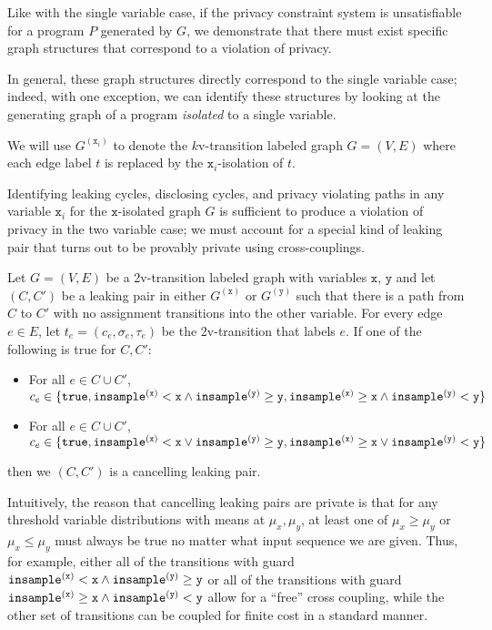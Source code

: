 Like with the single variable case, if the privacy constraint system is unsatisfiable for a program $P$ generated by $G$, we demonstrate that there must exist specific graph structures that correspond to a violation of privacy.

In general, these graph structures directly correspond to the single variable case; indeed, with one exception, we can identify these structures by looking at the generating graph of a program \textit{isolated} to a single variable. 

We will use $G^{(\texttt{x}_i)}$ to denote the $k$v-transition labeled graph $G = (V, E)$ where each edge label $t$ is replaced by the $\texttt{x}_i$-isolation of $t$. 

Identifying leaking cycles, disclosing cycles, and privacy violating paths in any variable $\texttt{x}_i$ for the $\texttt{x}$-isolated graph $G$ is sufficient to produce a violation of privacy in the two variable case; we must account for a special kind of leaking pair that turns out to be provably private using cross-couplings. 

\begin{defn}
    Let $G = (V, E)$ be a 2v-transition labeled graph with variables $\texttt{x}$, $\texttt{y}$ and let $(C, C')$ be a leaking pair in either $G^{(\texttt{x})}$ or $G^{(\texttt{y})}$ such that there is a path from $C$ to $C'$ with no assignment transitions into the other variable. For every edge $e\in E$, let $t_e = (c_e, \sigma_e, \tau_e)$ be the 2v-transition that labels $e$. 
    If one of the following is true for $C, C'$: \begin{itemize}
        \item For all $e\in C\cup C'$, $c_e \in \{\texttt{true}, \mvlguard[\texttt{x}]\land\mvgguard[\texttt{y}], \mvgguard[\texttt{x}]\land\mvlguard[\texttt{y}]\}$
        \item For all $e\in C\cup C'$, $c_e \in \{\texttt{true}, \mvlguard[\texttt{x}]\lor\mvgguard[\texttt{y}], \mvgguard[\texttt{x}]\lor\mvlguard[\texttt{y}]\}$
\end{itemize}
then we $(C, C')$ is a cancelling leaking pair. 
\end{defn}

Intuitively, the reason that cancelling leaking pairs are private is that for any threshold variable distributions with means at $\mu_x,\mu_y$, at least one of $\mu_x\geq\mu_y$ or $\mu_x\leq \mu_y$ must always be true no matter what input sequence we are given. 
Thus, for example, either all of the transitions with guard $\mvlguard[\texttt{x}]\land\mvgguard[\texttt{y}]$ or all of the transitions with guard $\mvgguard[\texttt{x}]\land\mvlguard[\texttt{y}]$ allow for a ``free'' cross coupling, while the other set of transitions can be coupled for finite cost in a standard manner.

